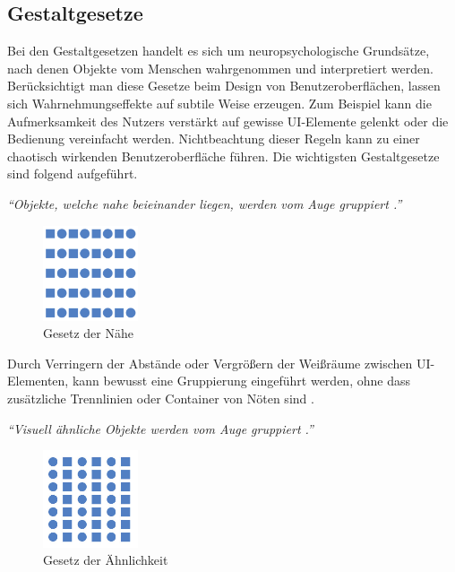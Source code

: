 \subsection{Gestaltgesetze} \label{sec:uidRules}
Bei den Gestaltgesetzen handelt es sich um neuropsychologische Grundsätze, nach denen Objekte vom Menschen wahrgenommen und interpretiert werden. Berücksichtigt man diese Gesetze beim Design von Benutzeroberflächen, lassen sich Wahrnehmungseffekte auf subtile Weise erzeugen. Zum Beispiel kann die Aufmerksamkeit des Nutzers verstärkt auf gewisse UI-Elemente gelenkt oder die Bedienung vereinfacht werden. Nichtbeachtung dieser Regeln kann zu einer chaotisch wirkenden Benutzeroberfläche führen. Die wichtigsten Gestaltgesetze sind folgend aufgeführt.\par
{}
\textit{\enquote{Objekte, welche nahe beieinander liegen, werden vom Auge gruppiert \cite[S. 186]{Moser2012}.}}\par
\begin{figure}[H]
 \centering
 \includegraphics[width=0.25\textwidth]{grafiken/Gesetz_Naehe.png}
 \caption{Gesetz der Nähe \cite{Schossmann}}
 \label{fig:gesetzNaehe}
\end{figure} 
Durch Verringern der Abstände oder Vergrößern der Weißräume zwischen UI-Elementen, kann bewusst eine Gruppierung eingeführt werden, ohne dass zusätzliche Trennlinien oder Container von Nöten sind \cite[S. 186]{Moser2012}.\par
{}
\textit{\enquote{Visuell ähnliche Objekte werden vom Auge gruppiert \cite[S. 187]{Moser2012}.}}\par
\begin{figure}[H]
 \centering
 \includegraphics[width=0.25\textwidth]{grafiken/Gesetz_Aehnl.png}
 \caption{Gesetz der Ähnlichkeit \cite{Grigo}}
 \label{fig:gesetzAehnl}
\end{figure} 
